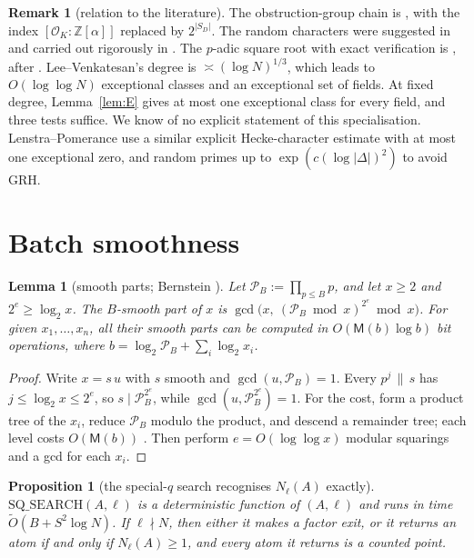 \documentclass[11pt]{amsart}
\newtheorem{lemma}[theorem]{Lemma}
\newtheorem{proposition}[theorem]{Proposition}
\theoremstyle{definition}
\newtheorem{remark}[theorem]{Remark}
\newcommand{\Z}{\mathbb{Z}}
\newcommand{\cO}{\mathcal{O}}
\begin{document}
\begin{remark}[relation to the literature]
The obstruction-group chain is \cite[Thm.~6.7]{blp1993}, with the index $[\cO_K:\Z[\alpha]]$ replaced by $2^{|S_D|}$. The random characters were suggested in
\cite[\S8]{blp1993} and carried out rigorously in \cite[\S6]{lv2018}. The $p$-adic square root with exact verification is
\cite[\S9]{blp1993}, after \cite{weinbergerrothschild1976}. Lee--Venkatesan's degree is $\asymp(\log N)^{1/3}$, which leads to $O(\log\log N)$ exceptional
classes and an exceptional set of fields. At fixed degree, Lemma~\ref{lem:E} gives at most one exceptional class for every field, and three tests
suffice. We know of no explicit statement of this specialisation. Lenstra--Pomerance \cite[\S\S3--4]{lp1992} use a similar
explicit Hecke-character estimate with at most one exceptional zero, and random primes up to $\exp(c(\log|\Delta|)^2)$ to avoid GRH.
\end{remark}

\section{Batch smoothness}\label{sec:batch}

\begin{lemma}[smooth parts; Bernstein {\cite{bernstein2004,bernstein2008}}]\label{lem:BS}
Let $\mathcal P_B:=\prod_{p\le B}p$, and let $x\ge2$ and $2^e\ge\log_2x$. The $B$-smooth part of $x$ is
$\gcd\bigl(x,\ (\mathcal P_B\bmod x)^{2^e}\bmod x\bigr)$. For given $x_1,\dots,x_n$, all their smooth parts can be computed in
$O(\mathsf M(b)\log b)$ bit operations, where $b=\log_2\mathcal P_B+\sum_i\log_2x_i$.
\end{lemma}

\begin{proof}
Write $x=s\,u$ with $s$ smooth and $\gcd(u,\mathcal P_B)=1$. Every $p^j\,\|\,s$ has $j\le\log_2x\le2^e$, so $s\mid\mathcal P_B^{2^e}$, while
$\gcd(u,\mathcal P_B^{2^e})=1$. For the cost, form a product tree of the $x_i$, reduce $\mathcal P_B$ modulo the product, and descend a
remainder tree; each level costs $O(\mathsf M(b))$ \cite[\S\S10.1--10.3]{gathengerhard}. Then perform $e=O(\log\log x)$ modular squarings and a gcd for each $x_i$.
\end{proof}

\begin{proposition}[the special-$q$ search recognises $N_\ell(A)$ exactly]\label{prop:BS}
$\mathrm{SQ\_SEARCH}(A,\ell)$ is a deterministic function of $(A,\ell)$ and runs in time $\tilde O(B+S^2\log N)$. If $\ell\nmid N$, then either it makes a
factor exit, or it returns an atom if and only if $N_\ell(A)\ge1$, and every atom it returns is a counted point.
\end{proposition}
\end{document}
